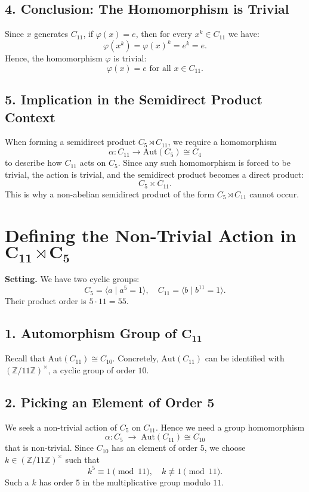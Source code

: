 \documentclass[12pt]{article}
\theoremstyle{definition} %
\theoremstyle{plain} %
\begin{document}
\subsection*{4. Conclusion: The Homomorphism is Trivial}
Since \(x\) generates \(C_{11}\), if \(\varphi(x) = e\), then for every \(x^k \in C_{11}\) we have:
\[
\varphi(x^k) = \varphi(x)^k = e^k = e.
\]
Hence, the homomorphism \(\varphi\) is trivial:
\[
\boxed{\varphi(x) = e \text{ for all } x \in C_{11}.}
\]

\subsection*{5. Implication in the Semidirect Product Context}
When forming a semidirect product \(C_5 \rtimes C_{11}\), we require a homomorphism
\[
\alpha: C_{11} \to \mathrm{Aut}(C_5) \cong C_4
\]
to describe how \(C_{11}\) acts on \(C_5\). Since any such homomorphism is forced to be trivial, the action is trivial, and the semidirect product becomes a direct product:
\[
C_5 \times C_{11}.
\]
This is why a non-abelian semidirect product of the form \(C_{5} \rtimes C_{11}\) cannot occur.


\section*{Defining the Non-Trivial Action in \(\boldsymbol{C_{11} \rtimes C_{5}}\)}

\noindent
\textbf{Setting.} 
We have two cyclic groups:
\[
C_{5} = \langle a \mid a^5 = 1 \rangle,
\quad
C_{11} = \langle b \mid b^{11} = 1 \rangle.
\]
Their product order is \(5 \cdot 11 = 55\).

\subsection*{1. Automorphism Group of \(\boldsymbol{C_{11}}\)}
Recall that \(\mathrm{Aut}(C_{11}) \cong C_{10}\). Concretely, 
\(\mathrm{Aut}(C_{11})\) can be identified with 
\((\mathbb{Z}/11\mathbb{Z})^\times\), a cyclic group of order \(10\).

\subsection*{2. Picking an Element of Order 5}
We seek a non-trivial action of \(C_{5}\) on \(C_{11}\). 
Hence we need a group homomorphism
\[
\alpha : C_{5} \;\to\; \mathrm{Aut}(C_{11}) \cong C_{10}
\]
that is non-trivial. Since \(C_{10}\) has an element of order \(5\), we choose 
\(k \in (\mathbb{Z}/11\mathbb{Z})^\times\) such that
\[
k^5 \equiv 1 \pmod{11}, 
\quad
k \not\equiv 1 \pmod{11}.
\]
Such a \(k\) has order \(5\) in the multiplicative group modulo \(11\).
\end{document}

